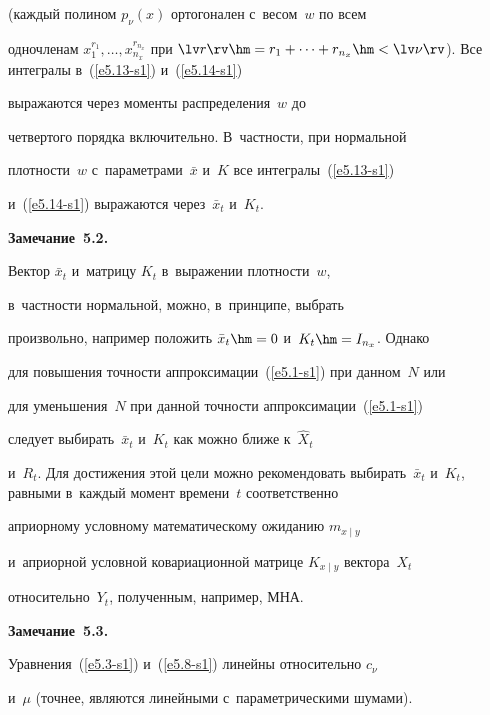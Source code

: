 (каждый полином  $p_\nu (x)$ ортогонален с~весом~$w$ по всем

одночленам $x_1^{r_1},\ldots, x_{n_x}^{r_{n_x}}$ при  $\lv r\rv \hm=

r_1+\cdots + r_{n_x} \hm<\lv\nu\rv$). Все интегралы в~(\ref{e5.13-s1}) и~(\ref{e5.14-s1})  

выражаются через моменты распределения~$w$ до

четвертого порядка включительно. В~частности, при нормальной

плотности~$w$ с~параметрами~$\bar x$ и~$K$ все интегралы~(\ref{e5.13-s1}) 

и~(\ref{e5.14-s1}) выражаются через~$\bar x_t$ и~$K_t$.



\smallskip



\noindent

\textbf{Замечание~5.2.}\

 Вектор $\bar x_t$ и~матрицу  $K_t$ в~выражении плотности~$w$, 

 в~част\-ности нормальной, можно, в~принципе, выбрать

произвольно, например положить $\bar x_t\hm=0$ и~$K_t\hm=I_{n_x}$. Однако

для повышения точности аппроксимации~(\ref{e5.1-s1}) при данном~$N$ или

для уменьшения~$N$ при данной точности аппроксимации~(\ref{e5.1-s1})

следует выбирать~$\bar x_t$ и~$K_t$ как можно ближе к~$\hat X_t$ 

и~$R_t$. Для достижения этой цели можно рекомендовать выбирать~$\bar

x_t$ и~$K_t$, равными в~каждый момент времени~$t$ соответственно

априорному условному математическому ожиданию $m_{x\mid y}$ 

и~априорной условной ковариационной матрице $K_{x\mid y}$ вектора~$X_t$ 

относительно~$Y_t$, полученным, например, МНА.



\smallskip



\noindent

\textbf{Замечание~5.3.}\

 Уравнения~(\ref{e5.3-s1}) и~(\ref{e5.8-s1}) линейны относительно  $c_\nu$ 

 и~$\mu$ (точнее, являются линейными с~параметрическими шумами).

